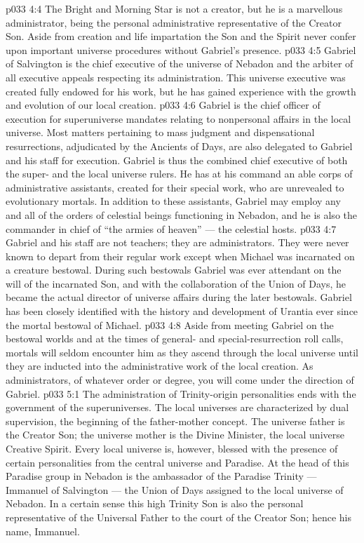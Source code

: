 \vs p033 4:4 \pc The Bright and Morning Star is not a creator, but he is a marvellous administrator, being the personal administrative representative of the Creator Son. Aside from creation and life impartation the Son and the Spirit never confer upon important universe procedures without Gabriel’s presence.
\vs p033 4:5 Gabriel of Salvington is the chief executive of the universe of Nebadon and the arbiter of all executive appeals respecting its administration. This universe executive was created fully endowed for his work, but he has gained experience with the growth and evolution of our local creation.
\vs p033 4:6 Gabriel is the chief officer of execution for superuniverse mandates relating to nonpersonal affairs in the local universe. Most matters pertaining to mass judgment and dispensational resurrections, adjudicated by the Ancients of Days, are also delegated to Gabriel and his staff for execution. Gabriel is thus the combined chief executive of both the super\hyp{} and the local universe rulers. He has at his command an able corps of administrative assistants, created for their special work, who are unrevealed to evolutionary mortals. In addition to these assistants, Gabriel may employ any and all of the orders of celestial beings functioning in Nebadon, and he is also the commander in chief of “the armies of heaven” --- the celestial hosts.
\vs p033 4:7 \pc Gabriel and his staff are not teachers; they are administrators. They were never known to depart from their regular work except when Michael was incarnated on a creature bestowal. During such bestowals Gabriel was ever attendant on the will of the incarnated Son, and with the collaboration of the Union of Days, he became the actual director of universe affairs during the later bestowals. Gabriel has been closely identified with the history and development of Urantia ever since the mortal bestowal of Michael.
\vs p033 4:8 Aside from meeting Gabriel on the bestowal worlds and at the times of general\hyp{} and special\hyp{}resurrection roll calls, mortals will seldom encounter him as they ascend through the local universe until they are inducted into the administrative work of the local creation. As administrators, of whatever order or degree, you will come under the direction of Gabriel.
\vs p033 5:1 The administration of Trinity\hyp{}origin personalities ends with the government of the superuniverses. The local universes are characterized by dual supervision, the beginning of the father\hyp{}mother concept. The universe father is the Creator Son; the universe mother is the Divine Minister, the local universe Creative Spirit. Every local universe is, however, blessed with the presence of certain personalities from the central universe and Paradise. At the head of this Paradise group in Nebadon is the ambassador of the Paradise Trinity --- Immanuel of Salvington --- the Union of Days assigned to the local universe of Nebadon. In a certain sense this high Trinity Son is also the personal representative of the Universal Father to the court of the Creator Son; hence his name, Immanuel.
